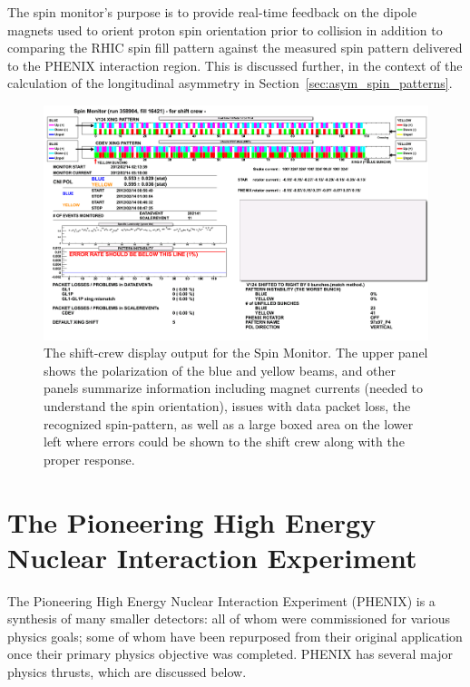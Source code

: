 The spin monitor's purpose is to provide real-time feedback on the dipole
magnets used to orient proton spin orientation prior to collision in addition to
comparing the RHIC spin fill pattern against the measured spin pattern delivered
to the PHENIX interaction region. This is discussed further, in the context of
the calculation of the longitudinal asymmetry in
Section~\ref{sec:asym_spin_patterns}.

\begin{figure}
  \centering
  \includegraphics[width=\linewidth]{./figures/SPINMON_shift_358904.png}
  \caption{
    The shift-crew display output for the Spin Monitor. The upper panel shows
    the polarization of the blue and yellow beams, and other panels summarize
    information including magnet currents (needed to understand the spin
    orientation), issues with data packet loss, the recognized spin-pattern, as
    well as a large boxed area on the lower left where errors could be shown to
    the shift crew along with the proper response.
  }
  \label{fig:spin_monitor}
\end{figure}

\clearpage
\section{The Pioneering High Energy Nuclear Interaction Experiment}
\label{sec:PHENIX}

The Pioneering High Energy Nuclear Interaction Experiment (PHENIX) is a
synthesis of many smaller detectors: all of whom were commissioned for various
physics goals; some of whom have been repurposed from their original application
once their primary physics objective was completed. PHENIX has several major
physics thrusts, which are discussed below. 

